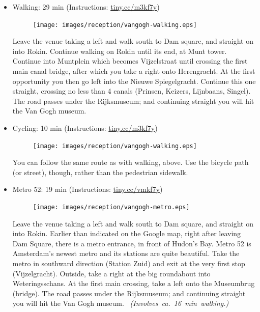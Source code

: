 \clearpage

\begin{itemize}

\item {Walking}: \hfill 29 min (Instructions: \url{tiny.cc/m3kf7y})

\begin{minipage}{.9\textwidth}
\begin{figure}
\vspace*{-1.2\baselineskip}%
\texttt{[image: images/reception/vangogh-walking.eps]}
\end{figure}
Leave the venue taking a left and walk south to Dam square, and straight on into Rokin. Continue walking on Rokin until its end, at Munt tower. Continue into Muntplein which becomes Vijzelstraat until crossing the first main canal bridge, after which you take a right onto Herengracht. At the first opportunity you then go left into the Nieuwe Spiegelgracht. Continue this one straight, crossing no less than 4 canals (Prinsen, Keizers, Lijnbaans, Singel). The road passes under the Rijksmuseum; and continuing straight you will hit the Van Gogh museum.
\end{minipage}


\vspace{4mm}
\item {Cycling}: \hfill 10 min (Instructions: \url{tiny.cc/m3kf7y})

\begin{minipage}{.9\textwidth}
\begin{figure}
\vspace*{-1.2\baselineskip}%
\texttt{[image: images/reception/vangogh-walking.eps]}
\end{figure}
You can follow the same route as with walking, above. Use the bicycle path (or street), though, rather than the pedestrian sidewalk.
\end{minipage}

\item {Metro 52}: \hfill 19 min (Instructions: \url{tiny.cc/vmkf7y})

\begin{minipage}{.9\textwidth}
\begin{figure}
\vspace*{-1.2\baselineskip}%
\texttt{[image: images/reception/vangogh-metro.eps]}
\end{figure}
Leave the venue taking a left and walk south to Dam square, and straight on into Rokin. Earlier than indicated on the Google map, right after leaving Dam Square, there is a metro entrance, in front of Hudon's Bay. Metro 52 is Amsterdam's newest metro and its stations are quite beautiful. Take the metro in southward direction (Station Zuid) and exit at the very first stop (Vijzelgracht). Outside, take a right at the big roundabout into Weteringsschans. At the first main crossing, take a left onto the Museumbrug (bridge). The road passes under the Rijksmuseum; and continuing straight you will hit the Van Gogh museum.
~\hspace*{\fill}\mbox{\emph{(Involves ca.\ 16 min walking.)}}
\end{minipage}


\end{itemize}
